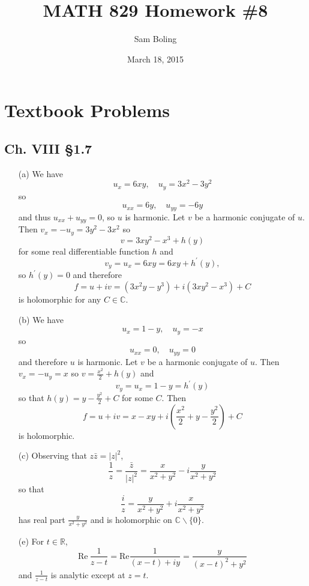 \documentclass{article}
\title{MATH 829 Homework \#8}
\date{March 18, 2015}
\author{Sam Boling}
\newcounter{Problem}
\begin{document}
\begin{titlepage}
\maketitle
\end{titlepage}

\section{Textbook Problems}
\subsection*{Ch. VIII \S 1.7}
\begin{itemize}
  \item[(a)]{
    We have
    $$
    u_x = 6xy, \quad
    u_y = 3x^2 - 3y^2
    $$
    so
    $$
    u_{xx} = 6y, \quad
    u_{yy} = -6y
    $$
    and thus $u_{xx} + u_{yy} = 0$, so $u$ is harmonic. Let $v$
    be a harmonic conjugate of $u$. Then 
    $
    v_x = -u_y = 3y^2 - 3x^2
    $
    so 
    $$
    v = 3xy^2 - x^3 + h(y)
    $$
    for some real differentiable function $h$ and 
    $$
    v_y = u_x = 6xy = 6xy + h^\prime(y),
    $$
    so $h^\prime(y) = 0$ and therefore
    $$
    f = u + i v = (3x^2 y - y^3) + i (3xy^2 - x^3) + C
    $$
    is holomorphic for any $C \in \mathbb{C}$.
  }
  \item[(b)]{
    We have
    $$
    u_{x} = 1 - y, \quad
    u_{y} = -x
    $$
    so
    $$
    u_{xx} = 0, \quad
    u_{yy} = 0
    $$
    and therefore $u$ is harmonic.
    Let $v$ be a harmonic conjugate of $u$.
    Then
    $v_x = -u_y = x$
    so $v = \frac{x^2}{2} + h(y)$ and
    $$
    v_y = u_x = 1 - y = h^\prime(y)
    $$
    so that $h(y) = y - \frac{y^2}{2} + C$ for some $C$. Then
    $$
    f = u + i v = x - xy + i\left(\frac{x^2}{2} + y - \frac{y^2}{2}\right) + C
    $$
    is holomorphic.
  }
  \item[(c)]{
    Observing that $z \bar{z} = |z|^2$,
    $$
      \frac{1}{z} 
    = \frac{\bar{z}}{|z|^2} 
    = \frac{x}{x^2 + y^2} - i\frac{y}{x^2 + y^2}
    $$
    so that
    $$
      \frac{i}{z}
    = \frac{y}{x^2 + y^2} + i\frac{x}{x^2 + y^2}
    $$
    has real part $\frac{y}{x^2 + y^2}$ and is holomorphic on
    $\mathbb{C} \backslash \{ 0 \}$.
  }
  \item[(e)]{
    For $t \in \mathbb{R}$, 
    $$
      \mathrm{Re}~\frac{1}{z - t} 
    = \mathrm{Re}\frac{1}{(x - t) + iy} 
    = \frac{y}{(x - t)^2 + y^2}
    $$
    and $\frac{1}{z - t}$ is analytic except at $z = t$.
  }
\end{itemize}
\end{document}
